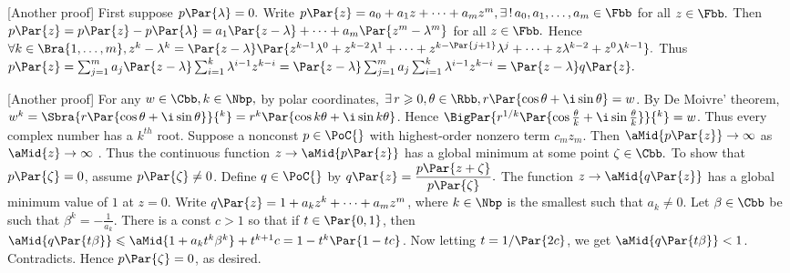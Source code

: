 \BulletPointX\NoteFor{[4.11]}\;\hfill[{\tgsc Another proof}]\TextB{\vspace{2pt}}
First suppose $p\Par{\lambda}=0.$ Write $p\Par{z}=a_0+a_1 z+\dots+a_m z^m,\exists\,!\,a_0,a_1,\dots,a_m\in\Fbb$ for all $z\in\Fbb.$\vspace{2pt}\TextB{}
Then $p\Par{z}=p\Par{z}-p\Par{\lambda}=a_1\Par{z-\lambda}+\dots+a_m\Par{z^m-\lambda^m}$ for all $z\in\Fbb.$\vspace{2pt}\TextB{}
Hence $\forall k\in\Bra{1,\dots,m},z^k-\lambda^k=\Par{z-\lambda}\Par{ z^{k-1}\lambda^0+ z^{k-2}\lambda^1+\dots+z^{k-\Par{j+1}}\lambda^j+\dots+z\lambda^{k-2}+z^0\lambda^{k-1}}.$\vspace{4pt}\TextB{}
Thus $p\Par{z}=\sum_{j=1}^m a_j \Par{z-\lambda}\sum_{i=1}^k \lambda^{i-1}z^{k-i}=\Par{z-\lambda}\sum_{j=1}^m a_j\sum_{i=1}^k \lambda^{i-1}z^{k-i}=\Par{z-\lambda}q\Par{z}.$\PfEnd
\SepLine

\BulletPointX\NoteFor{[4.13]}\; \vspace{2pt}\hfill[{\tgsc Another proof}]\TextB{}
For any $w\in\Cbb,k\in\Nbp,$ by polar coordinates, $\exists\,r\geqslant 0,\theta\in\Rbb,r\Par{\cos\theta + \i \sin\theta} = w$.\vspace{2pt}\TextB{}
By De Moivre' theorem, $w^k=\Sbra{r\Par{\cos\theta +\i\sin \theta}}{^k}=r^k\Par{\cos k\theta + \i \sin k\theta}$.\vspace{2pt}\TextB{}
Hence $\BigPar{r^{1/k}\Par{\cos\frac{\theta}{k} +\i\sin\frac{\theta}{k}}}{^k}=w$. Thus every complex number has a {\tgsl $k^{th}$ root}.\vspace{6pt}\TextB{}
Suppose a nonconst $p\in\PoC{}$ with highest-order nonzero term $c_m z_m.$\vspace{3pt}\TextB{}
Then $\aMid{p\Par{z}}\rightarrow\infty$ as $\aMid{z}\rightarrow\infty$ .\vspace{3pt}\TextB{}
\vspace{3pt}Thus the continuous function $z\rightarrow\aMid{p\Par{z}}$ has a global minimum at some point $\zeta\in\Cbb.$\TextB{}
\vspace{3pt}To show that $p\Par{\zeta} = 0$, assume $p\Par{\zeta}\neq 0$. Define $q\in\PoC{}$ by $q\Par{z}=\displaystyle\frac{p\Par{z+\zeta}}{p\Par{\zeta}}.$\TextB{}
\vspace{3pt}The function $z\rightarrow\aMid{q\Par{z}}$ has a global minimum value of $1$ at $z = 0$.\TextB{}
\vspace{3pt}Write $q\Par{z} = 1 + a_k z^k + \dots + a_m z^m$, where $k\in\Nbp$ is the smallest such that $a_k\neq 0$.\TextB{}
\vspace{3pt}Let $\beta\in\Cbb$ be such that $\displaystyle\beta^k=-\frac{1}{a_k}$.\TextB{}
\vspace{4pt}There is a const $c > 1$ so that if
$t\in \Par{0, 1}$, then $\aMid{q\Par{t\beta}}\leqslant\aMid{1 + a_k t^k\beta^k}+t^{k+1}c = 1 - t^k \Par{1 - tc}$.\TextB{}
Now letting $t=1/\Par{2c}$, we get $\aMid{q\Par{t\beta}}<1$. Contradicts. Hence $p\Par{\zeta} = 0$, as desired.\PfEnd
\SepLine\pagebreak

